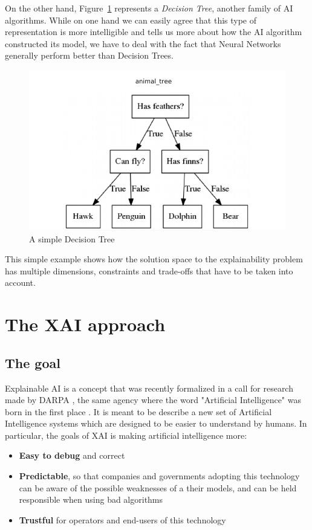 \documentclass[conference]{IEEEtran}
\newcommand{\cit}{\todo[tickmarkheight=0.2cm]{cit}}
\begin{document}
On the other hand, Figure~\ref{fig:dectree} represents a \textit{Decision Tree}, another family of AI algorithms. While on one hand we can easily agree that this type of representation is more intelligible and tells us more about how the AI algorithm constructed its model, we have to deal with the fact that Neural Networks generally perform better than Decision Trees.

\begin{figure}[ht!] \centering \includegraphics[width=0.9\linewidth]{images/dectree}
    \caption{A simple Decision Tree} \label{fig:dectree} \end{figure}

This simple example shows how the solution space to the explainability problem has multiple dimensions, constraints and trade-offs that have to be taken into account.

\section{The XAI approach}
\label{sec:xai}

\subsection{The goal}

Explainable AI is a concept that was recently formalized in a call for research made by DARPA \cit, the same agency where the word "Artificial
Intelligence" was born in the first place \cit. It is meant to be describe a new set
of Artificial Intelligence systems which are designed to be easier to understand
by humans. In particular, the goals of XAI is making artificial intelligence
more:

\begin{itemize}
    \item \textbf{Easy to debug} and correct
    \item \textbf{Predictable}, so that companies and governments adopting this technology can be aware of the possible weaknesses of a their models, and can be held responsible when using bad algorithms
    \item \textbf{Trustful} for operators and end-users of this technology
\end{itemize}
\end{document}
